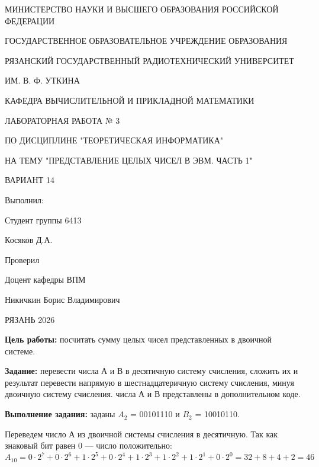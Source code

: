 \documentclass[a4paper, 12pt]{article}
\begin{document}
\begin{center}
    МИНИСТЕРСТВО НАУКИ И ВЫСШЕГО ОБРАЗОВАНИЯ РОССИЙСКОЙ ФЕДЕРАЦИИ

    ГОСУДАРСТВЕННОЕ ОБРАЗОВАТЕЛЬНОЕ УЧРЕЖДЕНИЕ ОБРАЗОВАНИЯ

    РЯЗАНСКИЙ ГОСУДАРСТВЕННЫЙ РАДИОТЕХНИЧЕСКИЙ УНИВЕРСИТЕТ 

    ИМ. В. Ф. УТКИНА

    КАФЕДРА ВЫЧИСЛИТЕЛЬНОЙ И ПРИКЛАДНОЙ МАТЕМАТИКИ 
\end{center}

\vspace{5 cm}

\begin{center}
    ЛАБОРАТОРНАЯ РАБОТА № 3

    ПО ДИСЦИПЛИНЕ "ТЕОРЕТИЧЕСКАЯ ИНФОРМАТИКА"

    НА ТЕМУ "ПРЕДСТАВЛЕНИЕ ЦЕЛЫХ ЧИСЕЛ В ЭВМ. ЧАСТЬ 1"

    ВАРИАНТ 14

\end{center}

\vspace{7 cm}

\begin{flushright}
    Выполнил:

    Студент группы 6413

    Косяков Д.А.

    Проверил

    Доцент кафедры ВПМ

    Никичкин Борис Владимирович
\end{flushright}

\begin{center}
    РЯЗАНЬ 2026
\end{center}

\pagebreak

\textbf{ Цель работы:} посчитать сумму целых чисел представленных в двоичной системе.

\textbf{ Задание:} перевести числа А и В в десятичную систему счисления, 
сложить их и результат перевести напрямую в шестнадцатеричную систему счисления, минуя двоичную систему счисления.
числа А и В представлены в дополнительном коде.

\textbf{ Выполнение задания:} заданы $A_2$ = 00101110 и $B_2$ = 10010110. 

Переведем число А из двоичной системы счисления в десятичную. Так как знаковый бит равен 0 --- число положительно:
 $$A_{10} = 0 \cdot 2^7 + 0 \cdot 2^6 + 1 \cdot 2^5 + 0 \cdot 2^4 + 1 \cdot 2^3 + 1 \cdot 2^2 + 1 \cdot 2^1 + 0 \cdot 2^0 = 32 + 8 + 4 + 2 = 46$$
\end{document}
